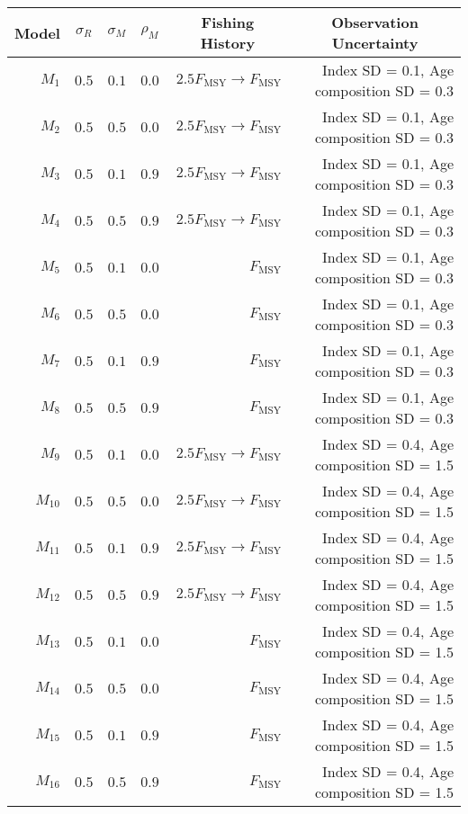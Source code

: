 \begin{center}
\begin{tabular}{rrrrrr}
\hline\hline
\multicolumn{1}{c}{Model}&\multicolumn{1}{c}{$\sigma_R$}&\multicolumn{1}{c}{$\sigma_{M}$}&\multicolumn{1}{c}{$\rho_{M}$}&\multicolumn{1}{c}{Fishing History}&\multicolumn{1}{c}{Observation Uncertainty}\tabularnewline
\hline
$M_{1}$&$0.5$&$0.1$&$0.0$&$2.5 F_{\text{MSY}} \rightarrow F_{\text{MSY}}$&Index SD = 0.1, Age composition SD = 0.3\tabularnewline
$M_{2}$&$0.5$&$0.5$&$0.0$&$2.5 F_{\text{MSY}} \rightarrow F_{\text{MSY}}$&Index SD = 0.1, Age composition SD = 0.3\tabularnewline
$M_{3}$&$0.5$&$0.1$&$0.9$&$2.5 F_{\text{MSY}} \rightarrow F_{\text{MSY}}$&Index SD = 0.1, Age composition SD = 0.3\tabularnewline
$M_{4}$&$0.5$&$0.5$&$0.9$&$2.5 F_{\text{MSY}} \rightarrow F_{\text{MSY}}$&Index SD = 0.1, Age composition SD = 0.3\tabularnewline
$M_{5}$&$0.5$&$0.1$&$0.0$&$F_{\text{MSY}}$&Index SD = 0.1, Age composition SD = 0.3\tabularnewline
$M_{6}$&$0.5$&$0.5$&$0.0$&$F_{\text{MSY}}$&Index SD = 0.1, Age composition SD = 0.3\tabularnewline
$M_{7}$&$0.5$&$0.1$&$0.9$&$F_{\text{MSY}}$&Index SD = 0.1, Age composition SD = 0.3\tabularnewline
$M_{8}$&$0.5$&$0.5$&$0.9$&$F_{\text{MSY}}$&Index SD = 0.1, Age composition SD = 0.3\tabularnewline
$M_{9}$&$0.5$&$0.1$&$0.0$&$2.5 F_{\text{MSY}} \rightarrow F_{\text{MSY}}$&Index SD = 0.4, Age composition SD = 1.5\tabularnewline
$M_{10}$&$0.5$&$0.5$&$0.0$&$2.5 F_{\text{MSY}} \rightarrow F_{\text{MSY}}$&Index SD = 0.4, Age composition SD = 1.5\tabularnewline
$M_{11}$&$0.5$&$0.1$&$0.9$&$2.5 F_{\text{MSY}} \rightarrow F_{\text{MSY}}$&Index SD = 0.4, Age composition SD = 1.5\tabularnewline
$M_{12}$&$0.5$&$0.5$&$0.9$&$2.5 F_{\text{MSY}} \rightarrow F_{\text{MSY}}$&Index SD = 0.4, Age composition SD = 1.5\tabularnewline
$M_{13}$&$0.5$&$0.1$&$0.0$&$F_{\text{MSY}}$&Index SD = 0.4, Age composition SD = 1.5\tabularnewline
$M_{14}$&$0.5$&$0.5$&$0.0$&$F_{\text{MSY}}$&Index SD = 0.4, Age composition SD = 1.5\tabularnewline
$M_{15}$&$0.5$&$0.1$&$0.9$&$F_{\text{MSY}}$&Index SD = 0.4, Age composition SD = 1.5\tabularnewline
$M_{16}$&$0.5$&$0.5$&$0.9$&$F_{\text{MSY}}$&Index SD = 0.4, Age composition SD = 1.5\tabularnewline
\hline
\end{tabular}\end{center}
